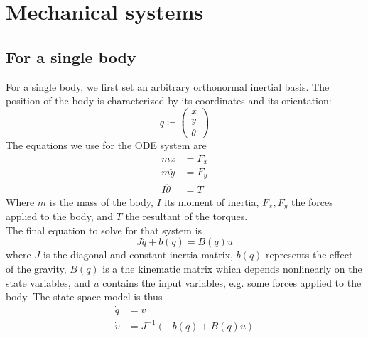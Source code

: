 \documentclass[12pt, openany]{report}
\theoremstyle{definition}
\begin{document}
\section{Mechanical systems}\label{sec:mechanical}
\subsection{For a single body}
For a single body, we first set an arbitrary orthonormal inertial basis. The position of the body is characterized by its coordinates and its orientation:
\begin{equation}
    q \coloneqq \begin{pmatrix}
        x\\y\\\theta
    \end{pmatrix}
\end{equation}
The equations we use for the ODE system are
\begin{align}
    m\ddot x &= F_x\\
    m\ddot y &= F_y\\
    I\ddot \theta &= T
\end{align}
Where $m$ is the mass of the body, $I$ its moment of inertia, $F_x,F_y$ the forces applied to the body, and $T$ the resultant of the torques. \\
The final equation to solve for that system is 
\begin{equation}
    J\ddot q+b(q) = B(q)u
\end{equation}
where $J$ is the diagonal and constant inertia matrix, $b(q)$ represents the effect of the gravity, $B(q)$ is a the kinematic matrix which depends nonlinearly on the state variables, and $u$ contains the input variables, e.g. some forces applied to the body. The state-space model is thus 
\begin{align}
    \dot q&= v \nonumber \\
    \dot v &= J^{-1}(-b(q)+B(q)u)
\end{align}
\end{document}
